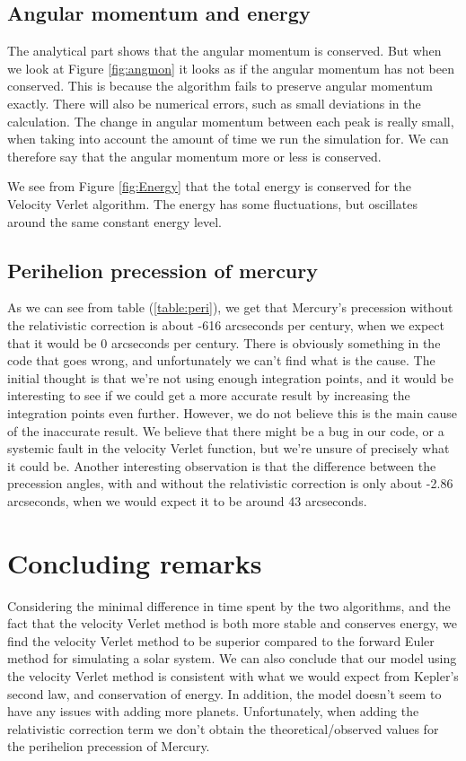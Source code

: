 \documentclass{article}
\begin{document}
\begin{multicols}{2}
\subsection{Angular momentum and energy}

The analytical part shows that the angular momentum is conserved. But when we look at Figure \ref{fig:angmon} it looks as if the angular momentum has not been conserved. This is because the algorithm fails to preserve angular momentum exactly. There will also be numerical errors, such as small deviations in the calculation. The change in angular momentum between each peak is really small, when taking into account the amount of time we run the simulation for. We can therefore say that the angular momentum more or less is conserved. 

We see from Figure \ref{fig:Energy} that the total energy is conserved for the Velocity Verlet algorithm. The energy has some fluctuations, but oscillates around the same constant energy level.

\subsection{Perihelion precession of mercury}
As we can see from table (\ref{table:peri}), we get that Mercury's precession without the relativistic correction is about -616 arcseconds per century, when we expect that it would be 0 arcseconds per century. There is obviously something in the code that goes wrong, and unfortunately we can't find what is the cause. The initial thought is that we're not using enough integration points, and it would be interesting to see if we could get a more accurate result by increasing the integration points even further. However, we do not believe this is the main cause of the inaccurate result.  We believe that there might be a bug in our code, or a systemic fault in the velocity Verlet function, but we're unsure of precisely what it could be. Another interesting observation is that the difference between the precession angles, with and without the relativistic correction is only about -2.86 arcseconds, when we would expect it to be around 43 arcseconds.  

\section{Concluding remarks}
Considering the minimal difference in time spent by the two algorithms, and the fact that the velocity Verlet method is both more stable and conserves energy, we find the velocity Verlet method to be superior compared to the forward Euler method for simulating a solar system. We can also conclude that our model using the velocity Verlet method is consistent with what we would expect from Kepler's second law, and conservation of energy. In addition, the model doesn't seem to have any issues with adding more planets. Unfortunately,  when adding the relativistic correction term we don't obtain the theoretical/observed values for the perihelion precession of Mercury.

\end{multicols}
\end{document}
